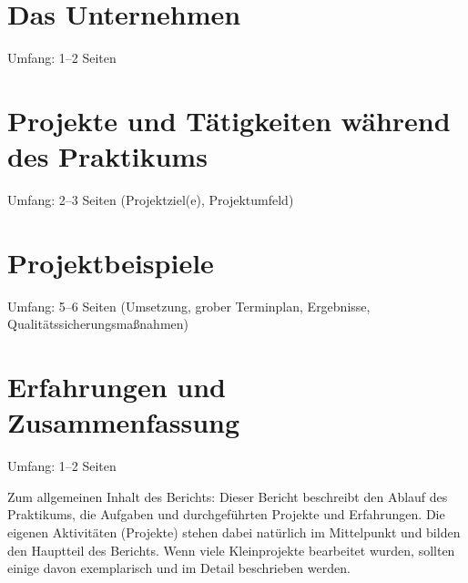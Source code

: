 \documentclass[praktikum,german]{hgbthesis}
\begin{document}
\mainmatter           %

\chapter{Das Unternehmen}
Umfang: 1--2 Seiten

\chapter{Projekte und Tätigkeiten während des Praktikums}
Umfang: 2--3 Seiten (Projektziel(e), Projektumfeld)
      
\chapter{Projektbeispiele}
Umfang: 5--6 Seiten (Umsetzung, grober Terminplan, Ergebnisse, Qualitätssicherungsmaßnahmen)
   
   
\chapter{Erfahrungen und Zusammenfassung}
Umfang: 1--2 Seiten


Zum allgemeinen Inhalt des Berichts: Dieser Bericht beschreibt den Ablauf des Praktikums, die Aufgaben und durchgeführten Projekte und Erfahrungen. Die eigenen Aktivitäten (Projekte) stehen dabei natürlich im Mittelpunkt und bilden den Hauptteil des Berichts. Wenn viele Kleinprojekte bearbeitet wurden, sollten einige davon exemplarisch und im Detail beschrieben werden.


%
\end{document}
